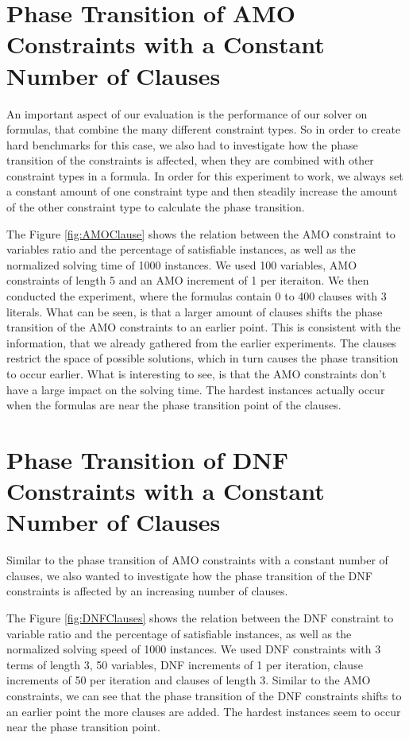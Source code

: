 \section{Phase Transition of AMO Constraints with a Constant Number of Clauses}

An important aspect of our evaluation is the performance of our solver on formulas, that combine the many different constraint types. So in order to create hard benchmarks for this case, we also had to investigate how the phase transition of the constraints is affected, when they are combined with other constraint types in a formula. In order for this experiment to work, we always set a constant amount of one constraint type and then steadily increase the amount of the other constraint type to calculate the phase transition.

	

The Figure \ref{fig:AMOClause} shows the relation between the AMO constraint to variables ratio and the percentage of satisfiable instances, as well as the normalized solving time of 1000 instances. We used 100 variables, AMO constraints of length 5 and an AMO increment of 1 per iteraiton. We then conducted the experiment, where the formulas contain 0 to 400 clauses with 3 literals. What can be seen, is that a larger amount of clauses shifts the phase transition of the AMO constraints to an earlier point. This is consistent with the information, that we already gathered from the earlier experiments. The clauses restrict the space of possible solutions, which in turn causes the phase transition to occur earlier. What is interesting to see, is that the AMO constraints don't have a large impact on the solving time. The hardest instances actually occur when the formulas are near the phase transition point of the clauses.

\section{Phase Transition of DNF Constraints with a Constant Number of Clauses}

Similar to the phase transition of AMO constraints with a constant number of clauses, we also wanted to investigate how the phase transition of the DNF constraints is affected by an increasing number of clauses.

	

The Figure \ref{fig:DNFClauses} shows the relation between the DNF constraint to variable ratio and the percentage of satisfiable instances, as well as the normalized solving speed of 1000 instances. We used DNF constraints with 3 terms of length 3, 50 variables, DNF increments of 1 per iteration, clause increments of 50 per iteration and clauses of length 3. Similar to the AMO constraints, we can see that the phase transition of the DNF constraints shifts to an earlier point the more clauses are added. The hardest instances seem to occur near the phase transition point.

